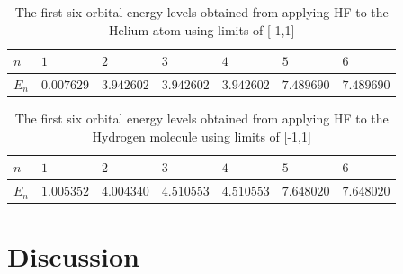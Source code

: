 \documentclass[10pt, oneside, letterpaper]{article}
\begin{document}
\begin{table}[H]
\begin{center}
\begin{tabular}{l|llllll}\hline
$n$    & $1$    & $2$     & $3$     & $4$      & $5$      & $6$      \\\hline
$E_n$  & $0.007629$  & $3.942602$  & $3.942602$  & $3.942602$  & $7.489690$  & $7.489690$ \\\hline
\end{tabular}
\end{center}
  \caption{The first six orbital energy levels obtained from applying HF to the Helium atom using limits of [-1,1]}
  \label{orbital-energies-he-l1}
\end{table}

\begin{table}[H]
\begin{center}
\begin{tabular}{l|llllll}\hline
$n$    & $1$    & $2$     & $3$     & $4$      & $5$      & $6$      \\\hline
$E_n$  & $1.005352$  & $4.004340$  & $4.510553$  & $4.510553$  & $7.648020$  & $7.648020$ \\\hline
\end{tabular}
\end{center}
  \caption{The first six orbital energy levels obtained from applying HF to the Hydrogen molecule using limits of [-1,1]}
  \label{orbital-energies-h2-l1}
\end{table}

\newpage
\section{Discussion}
\end{document}
